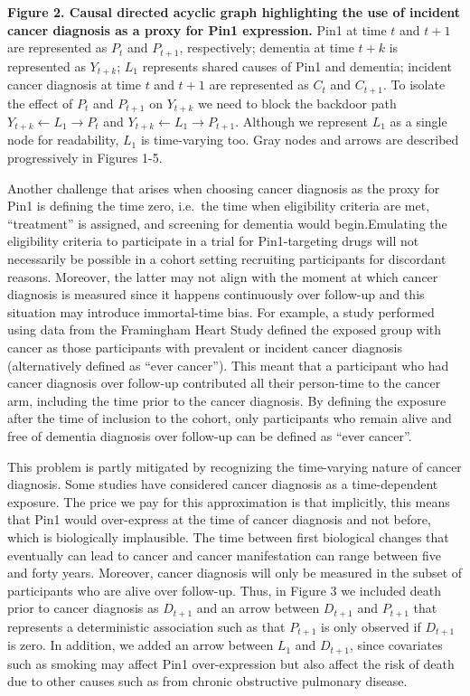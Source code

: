 \documentclass[
]{book}
\begin{document}
\textbf{Figure 2. Causal directed acyclic graph highlighting the use of incident cancer diagnosis as a proxy for Pin1 expression.} Pin1 at time \(t\) and \(t+1\) are represented as \(P_t\) and \(P_{t+1}\), respectively; dementia at time \(t+k\) is represented as \(Y_{t+k}\); \(L_1\) represents shared causes of Pin1 and dementia; incident cancer diagnosis at time \(t\) and \(t+1\) are represented as \(C_t\) and \(C_{t+1}\). To isolate the effect of \(P_t\) and \(P_{t+1}\) on \(Y_{t+k}\) we need to block the backdoor path \(Y_{t+k} \leftarrow L_1 \rightarrow P_t\) and \(Y_{t+k} \leftarrow L_1 \rightarrow P_{t+1}\). Although we represent \(L_1\) as a single node for readability, \(L_1\) is time-varying too. Gray nodes and arrows are described progressively in Figures 1-5.

Another challenge that arises when choosing cancer diagnosis as the proxy for Pin1 is defining the time zero, i.e.~the time when eligibility criteria are met, ``treatment'' is assigned, and screening for dementia would begin\autocite{hernan2016}.Emulating the eligibility criteria to participate in a trial for Pin1-targeting drugs will not necessarily be possible in a cohort setting recruiting participants for discordant reasons. Moreover, the latter may not align with the moment at which cancer diagnosis is measured since it happens continuously over follow-up and this situation may introduce immortal-time bias\autocite{hernan2016}. For example, a study performed using data from the Framingham Heart Study\autocite{driver2012} defined the exposed group with cancer as those participants with prevalent or incident cancer diagnosis (alternatively defined as ``ever cancer''\autocite{hanson2016}). This meant that a participant who had cancer diagnosis over follow-up contributed all their person-time to the cancer arm, including the time prior to the cancer diagnosis. By defining the exposure after the time of inclusion to the cohort, only participants who remain alive and free of dementia diagnosis over follow-up can be defined as ``ever cancer''\autocite[\textcite{hernan2016}]{anderson1983}.

This problem is partly mitigated by recognizing the time-varying nature of cancer diagnosis. Some studies have considered cancer diagnosis as a time-dependent exposure\autocite{white2013,hanson2016,bowles2017}. The price we pay for this approximation is that implicitly, this means that Pin1 would over-express at the time of cancer diagnosis and not before, which is biologically implausible. The time between first biological changes that eventually can lead to cancer and cancer manifestation can range between five and forty years\autocite{nadler2013}. Moreover, cancer diagnosis will only be measured in the subset of participants who are alive over follow-up. Thus, in Figure 3 we included death prior to cancer diagnosis as \(D_{t+1}\) and an arrow between \(D_{t+1}\) and \(P_{t+1}\) that represents a deterministic association such as that \(P_{t+1}\) is only observed if \(D_{t+1}\) is zero. In addition, we added an arrow between \(L_1\) and \(D_{t+1}\), since covariates such as smoking may affect Pin1 over-expression but also affect the risk of death due to other causes such as from chronic obstructive pulmonary disease.
\end{document}
